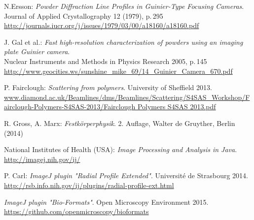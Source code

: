 \documentclass[a4paper, parskip=half, 12pt, bibliography=totocnumbered]{scrartcl}
\begin{document}





\begin{thebibliography}{10}
N.Ersson: \emph{Powder Diffraction Line Profiles in Guinier-Type Focusing Cameras}.\\
Journal of Applied Crystallography 12 (1979), p.\,295\\
\url{http://journals.iucr.org/j/issues/1979/03/00/a18160/a18160.pdf}

J. Gal et al.: \emph{Fast high-resolution characterization of powders using an imaging plate Guinier camera}.\\
Nuclear Instruments and Methods in Physics Research 2005, p.\,145\\
\url{http://www.geocities.ws/sunshine_mike_69/14_Guinier_Camera_670.pdf}

P. Fairclough: \emph{Scattering from polymers}. University of Sheffield 2013.\\
\url{www.diamond.ac.uk/Beamlines/dms/Beamlines/Scattering/S4SAS_Workshop/Fairclough-Polymers-S4SAS-2013/Fairclough Polymers S4SAS 2013.pdf}

R. Gross, A. Marx: \emph{Festkörperphysik}. 2. Auflage, Walter de Gruyther, Berlin (2014)

 National Institutes of Health (USA): \emph{Image Processing and Analysis in Java}.\\
\url{http://imagej.nih.gov/ij/}

P. Carl: \emph{ImageJ plugin "Radial Profile Extended"}. Université de Strasbourg 2014.\\
\url{http://rsb.info.nih.gov/ij/plugins/radial-profile-ext.html}

\emph{ImageJ plugin "Bio-Formats"}. Open Microscopy Environment 2015.\\
\url{https://github.com/openmicroscopy/bioformats}

\end{thebibliography}
\end{document}
